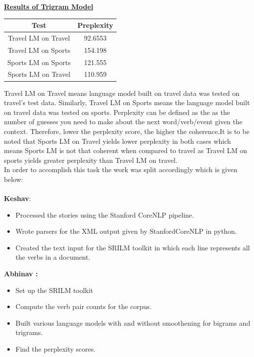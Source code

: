 \documentclass[11pt]{article}
\begin{document}
\underline{\textbf{Results of Trigram Model}} \\
\begin{table}[H]
\begin{center}
\begin{tabular}{|c|c|}
\hline 
\bf Test & \bf  Preplexity \\ 
\hline 
Travel LM on Travel & 92.6553 \\ 
\hline 
Travel LM on Sports & 154.198 \\ 
\hline 
Sports LM on Sports & 121.555 \\
\hline
Sports LM on Travel & 110.959 \\
\hline
\end{tabular} 
\end{center}
\end{table}
Travel LM on Travel means language model built on travel data was tested on travel's test data. Similarly, Travel LM on Sports means the language model built on travel data was tested on sports. Perplexity can be defined as the as the number of guesses you need to make about the next word/verb/event given the context. Therefore, lower the perplexity score, the higher the coherence.It is to be noted that Sports LM on Travel yields lower perplexity in both cases which means Sports LM is not that coherent when compared to travel as Travel LM on sports yields greater perplexity than Travel LM on travel. \\
In order to accomplish this task the work was split accordingly which is given below:  \\
\smallskip \\
{\bf Keshav}:  
\begin{itemize}
\item Processed the stories using the Stanford CoreNLP pipeline.
\item Wrote parsers for the XML output given by StanfordCoreNLP in python.
\item Created the text input for the SRILM toolkit in which each line represents all the verbs in a document.
\end{itemize} 
\smallskip
{\bf Abhinav :} 
\begin{itemize}
\item Set up the SRILM toolkit
\item Compute the verb pair counts for the corpus.
\item Built various language models with and without smoothening for bigrams and trigrams.
\item Find the perplexity scores.
\end{itemize} 
\end{document}
